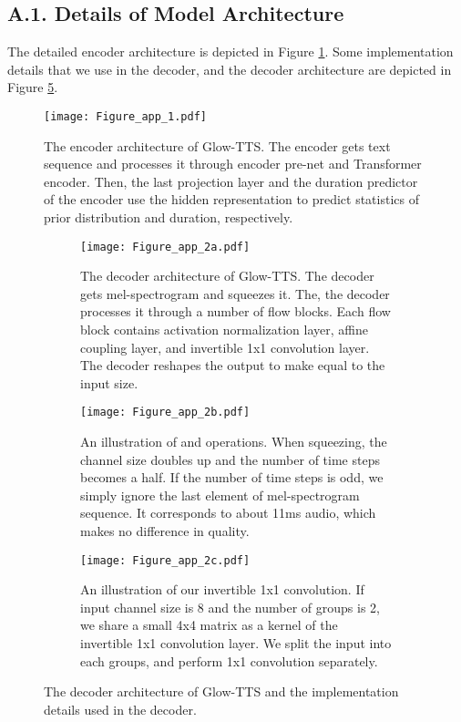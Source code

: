 \documentclass{article}
\begin{document}
\subsection*{A.1. Details of Model Architecture}
\label{appa1}
The detailed encoder architecture is depicted in Figure \ref{fig_app_1}.
Some implementation details that we use in the decoder, and the decoder architecture are depicted in Figure \ref{fig_app_2}.
\newline
\newline
\newline
\begin{figure}[h]
    \centering
    \texttt{[image: Figure\_app\_1.pdf]}
    \caption{The encoder architecture of Glow-TTS. The encoder gets text sequence and processes it through encoder pre-net and Transformer encoder. Then, the last projection layer and the duration predictor of the encoder use the hidden representation  to predict statistics of prior distribution and duration, respectively.}
    \label{fig_app_1}
\end{figure}
\newline
\newline
\begin{figure}[h]
    \centering
    \begin{subfigure}{.31\textwidth}
        \centering
        \texttt{[image: Figure\_app\_2a.pdf]}
        \caption{The decoder architecture of Glow-TTS. The decoder gets mel-spectrogram and squeezes it. The, the decoder processes it through a number of flow blocks. Each flow block contains activation normalization layer, affine coupling layer, and invertible 1x1 convolution layer. The decoder reshapes the output to make equal to the input size.}
        \label{fig_app_2:figure_a}
    \end{subfigure}\hfill \begin{subfigure}{.31\textwidth}
        \centering
        \texttt{[image: Figure\_app\_2b.pdf]}
        \caption{An illustration of  and  operations. When squeezing, the channel size doubles up and the number of time steps becomes a half. If the number of time steps is odd, we simply ignore the last element of mel-spectrogram sequence. It corresponds to about 11ms audio, which makes no difference in quality.}
        \label{fig_app_2:figure_b}
    \end{subfigure}\hfill \begin{subfigure}{.31\textwidth}
        \centering
        \texttt{[image: Figure\_app\_2c.pdf]}
        \caption{An illustration of our invertible 1x1 convolution. If input channel size is 8 and the number of groups is 2, we share a small 4x4 matrix as a kernel of the invertible 1x1 convolution layer. We split the input into each groups, and perform 1x1 convolution separately.}
        \label{fig_app_2:figure_c}
    \end{subfigure}
    \caption{The decoder architecture of Glow-TTS and the implementation details used in the decoder.}
    \label{fig_app_2}
\end{figure}
\end{document}

